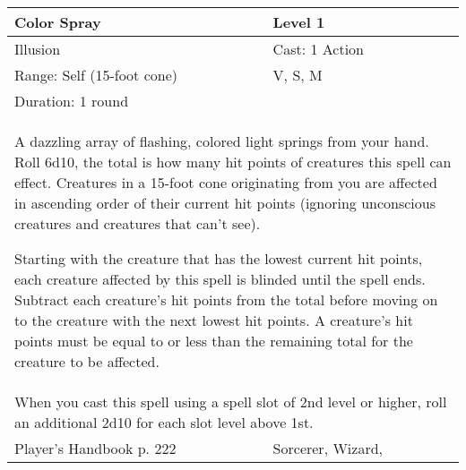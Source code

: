 \documentclass[11pt]{report}
\begin{document}
\begin{table}[H]
	\begin{tabular}{||p{6cm}|p{6cm}||}
		\hline\hline
		\bf{Color Spray} & Level 1\\ \hline
		Illusion & Cast: 1 Action\\ \hline
		Range: Self (15-foot cone) & V, S, M\\ \hline
		Duration: 1 round & \\ \hline
		\multicolumn{2}{||p{12cm}||}{A dazzling array of flashing, colored light springs from your hand. 
Roll 6d10, the total is how many hit points of creatures this spell can effect. Creatures in a 15-foot cone originating from you are affected in ascending order of their current hit points (ignoring unconscious creatures and creatures that can’t see). 

Starting with the creature that has the lowest current hit points, each creature affected by this spell is blinded until the spell ends. Subtract each creature’s hit points from the total before moving on to the creature with the next lowest hit points. A creature’s hit points must be equal to or less than the remaining total for the creature to be affected.}\\ \hline
		\multicolumn{2}{||p{12cm}||}{When you cast this spell using a spell slot of 2nd level or higher, roll an additional 2d10 for each slot level above 1st.}\\ \hline
Player's Handbook p. 222 & Sorcerer, Wizard, \\ \hline\hline
	\end{tabular}
\end{table}
\end{document}
